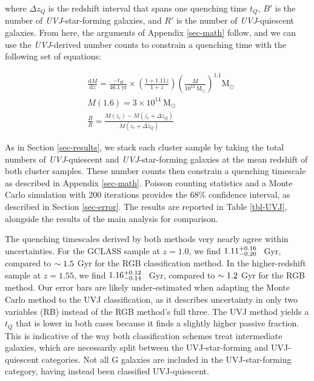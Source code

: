where $\Delta z_Q$ is the redshift interval that spans one quenching time $t_Q$, $B'$ is the number of \textit{UVJ}-star-forming galaxies, and $R'$ is the number of \textit{UVJ}-quiescent galaxies.
From here, the arguments of Appendix \ref{sec-math} follow, and we can use the \textit{UVJ}-derived number counts to constrain a quenching time with the following set of equations:

\begin{align*}
&\frac{\mathrm{d}M}{\mathrm{d}z} = \frac{-t_H}{46.1\ \mathrm{yr}} \times \left(\frac{1+1.11z}{1+z}\right)\left(\frac{M}{10^{12}\ \mathrm{M_\odot}}\right)^{1.1} \mathrm{M_\odot}\\
&M(1.6) = 3\times10^{14}\ \mathrm{M_\odot}\\
&\frac{B}{R} = \frac{M(z_c) - M(z_c + \Delta z_Q)}{M(z_c + \Delta z_Q)}
\end{align*}

As in Section \ref{sec-results}, we stack each cluster sample by taking the total numbers of \textit{UVJ}-quiescent and \textit{UVJ}-star-forming galaxies at the mean redshift of both cluster samples.
These number counts then constrain a quenching timescale as described in Appendix \ref{sec-math}.
Poisson counting statistics and a Monte Carlo simulation with 200 iterations provides the 68\% confidence interval, as described in Section \ref{sec-error}.
The results are reported in Table \ref{tbl-UVJ}, alongside the results of the main analysis for comparison.

The quenching timescales derived by both methods very nearly agree within uncertainties.
For the GCLASS sample at $z=1.0$, we find $1.11\substack{+0.16 \\ -0.20}$~ Gyr, compared to $\sim1.5$ Gyr for the RGB classification method.
In the higher-redshift sample at $z=1.55$, we find $1.16\substack{+0.12 \\ -0.14}$~ Gyr, compared to $\sim1.2$ Gyr for the RGB method.
Our error bars are likely under-estimated when adapting the Monte Carlo method to the UVJ classification, as it describes uncertainty in only two variables (RB) instead of the RGB method's full three.
The UVJ method yields a $t_Q$ that is lower in both cases because it finds a slightly higher passive fraction.
This is indicative of the way both classification schemes treat intermediate galaxies, which are necessarily split between the UVJ-star-forming and UVJ-quiescent categories.
Not all G galaxies are included in the UVJ-star-forming category, having instead been classified UVJ-quiescent.


